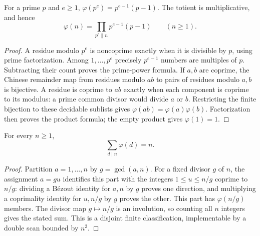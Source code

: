 \begin{theorem}
\label{el:totient}
For a prime $p$ and $e\ge1$,
$\varphi(p^e)=p^{e-1}(p-1)$.  The totient is multiplicative, and hence
\[
             \varphi(n)=\prod_{p^e\parallel n}p^{e-1}(p-1)
             \qquad(n\ge1).
\]
\end{theorem}
\begin{proof}
A residue modulo $p^e$ is noncoprime exactly when it is divisible by
$p$, using prime factorization.  Among $1,\ldots,p^e$ precisely
$p^{e-1}$ numbers are multiples of $p$.  Subtracting their count proves
the prime-power formula.  If $a,b$ are coprime, the Chinese remainder
map from residues modulo $ab$ to pairs of residues modulo $a,b$ is
bijective.  A residue is coprime to $ab$ exactly when each component
is coprime to its modulus: a prime common divisor would divide $a$
or $b$.  Restricting the finite bijection to these decidable sublists
gives $\varphi(ab)=\varphi(a)\varphi(b)$.  Factorization then proves
the product formula; the empty product gives $\varphi(1)=1$.
\end{proof}

\begin{theorem}\label{el:phisum}
For every $n\ge1$,
\[
                         \sum_{d\mid n}\varphi(d)=n.
\]
\end{theorem}
\begin{proof}
Partition $a=1,\ldots,n$ by $g=\gcd(a,n)$.  For a fixed divisor $g$
of $n$, the assignment $a=gu$ identifies this part with the integers
$1\le u\le n/g$ coprime to $n/g$: dividing a B\'ezout identity for
$a,n$ by $g$ proves one direction, and multiplying a coprimality
identity for $u,n/g$ by $g$ proves the other.  This part has
$\varphi(n/g)$ members.  The divisor map $g\mapsto n/g$ is an
involution, so counting all $n$ integers gives the stated sum.
This is a disjoint finite classification, implementable by a double
scan bounded by $n^2$.
\end{proof}

